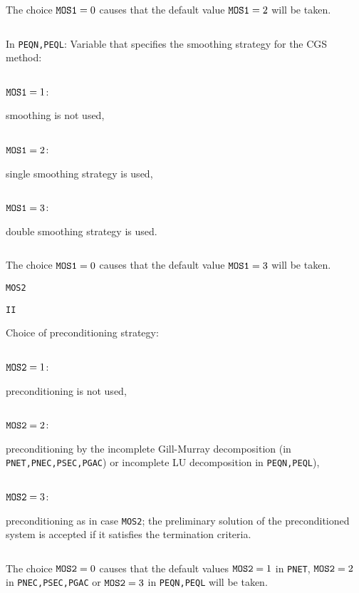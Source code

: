\documentclass{esub2acm}
\begin{document}
  \par\vspace{1mm}
\noindent\parbox{30mm}{$\;$}\parbox[t]{125mm}{The choice ${\tt MOS1}=0$
  causes that the default value ${\tt MOS1}=2$ will be taken.}
  \par\vspace{1mm}
\noindent \parbox{30mm}{$\;$}\parbox[t]{125mm}{In {\tt PEQN,PEQL}: Variable
  that specifies the smoothing strategy for the CGS method:}
  \par\vspace{1mm}
\noindent\parbox{30mm}{$\;$}\parbox{24mm}{${\tt MOS1}=1$:}\parbox[t]{101mm}{
  smoothing is not used,}
  \par
\noindent\parbox{30mm}{$\;$}\parbox{24mm}{${\tt MOS1}=2$:}\parbox[t]{101mm}{
  single smoothing strategy is used,}
  \par
\noindent\parbox{30mm}{$\;$}\parbox{24mm}{${\tt MOS1}=3$:}\parbox[t]{101mm}{
  double smoothing strategy is used.}
  \par\vspace{1mm}
\noindent\parbox{30mm}{$\;$}\parbox[t]{125mm}{The choice ${\tt MOS1}=0$
  causes that the default value ${\tt MOS1}=3$ will be taken.}
  \par\vspace{2mm}
\noindent\parbox{20mm}{\tt MOS2}\parbox{10mm}{\tt II}\parbox[t]{125mm}{
  Choice of preconditioning strategy:}
  \par\vspace{1mm}
\noindent\parbox{30mm}{$\;$}\parbox{24mm}{${\tt MOS2}=1$:}\parbox[t]{101mm}{
  preconditioning is not used,}
  \par
\noindent\parbox{30mm}{$\;$}\parbox{24mm}{${\tt MOS2}=2$:}\parbox[t]{101mm}{
  preconditioning by the incomplete Gill-Murray decomposition (in
  {\tt PNET,PNEC,PSEC,PGAC}) or incomplete LU decomposition in {\tt PEQN,PEQL}),}
  \par
\noindent\parbox{30mm}{$\;$}\parbox{24mm}{${\tt MOS2}=3$:}\parbox[t]{101mm}{
  preconditioning as in case {\tt MOS2}; the preliminary solution
  of the preconditioned system is accepted if it satisfies the termination
  criteria.}
  \par\vspace{1mm}
\noindent\parbox{30mm}{$\;$}\parbox[t]{125mm}{The choice ${\tt MOS2}=0$
  causes that the default values ${\tt MOS2}=1$ in {\tt PNET}, ${\tt MOS2}=2$
  in {\tt PNEC,PSEC,PGAC} or ${\tt MOS2}=3$ in {\tt PEQN,PEQL} will be taken.}
  \par\vspace{2mm}
\end{document}
